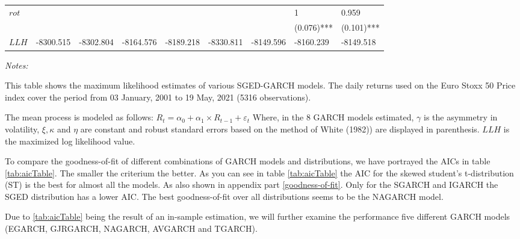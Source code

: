 \documentclass[a4paper, nobind]{templates/ociamthesis}
\begin{document}
\begin{landscape}
\begin{table}
\begin{threeparttable}
{\begin{tabular}[t]{lllllllll}
$rot$ &  &  &  &  &  &  & 1 & 0.959\\
 &  &  &  &  &  &  & (0.076)*** & (0.101)***\\
\addlinespace
$LLH$ & -8300.515 & -8302.804 & -8164.576 & -8189.218 & -8330.811 & -8149.596 & -8160.239 & -8149.518\\
\bottomrule
\end{tabular}}
\begin{tablenotes}
\item \textit{Notes:} 
\item This table shows the maximum likelihood estimates of various SGED-GARCH models. The daily returns used on the Euro Stoxx 50 Price index cover the period from 03 January, 2001 to 19 May, 2021 (5316 observations).
\item The mean process is modeled as follows: $R_t= \alpha_0+ \alpha_1 \times R_{t-1}+ \varepsilon_t$ Where, in the 8 GARCH models estimated, $\gamma$ is the asymmetry in volatility, $\xi, \kappa$ and $\eta$ are constant and robust standard errors based on the method of White (1982)) are displayed in parenthesis. $LLH$ is the maximized log likelihood value.
\end{tablenotes}
\end{threeparttable}
\end{table}
\end{landscape}

\clearpage
\newpage

\noindent To compare the goodness-of-fit of different combinations of GARCH models and distributions, we have portrayed the AICs in table \ref{tab:aicTable}. The smaller the criterium the better. As you can see in table \ref{tab:aicTable} the AIC for the skewed student's t-distribution (ST) is the best for almost all the models. As also shown in appendix part \ref{goodness-of-fit}. Only for the SGARCH and IGARCH the SGED distribution has a lower AIC. The best goodness-of-fit over all distributions seems to be the NAGARCH model.

\noindent  Due to \ref{tab:aicTable} being the result of an in-sample estimation, we will further examine the performance five different GARCH models (EGARCH, GJRGARCH, NAGARCH, AVGARCH and TGARCH).
\end{document}
